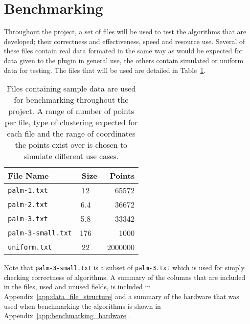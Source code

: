 
\section{Benchmarking}
\label{sec:benchmarking}

Throughout the project, a set of files will be used to test the algorithms that
are developed; their correctness and effectiveness, speed and resource use.
Several of these files contain real data formated in the same way as would be
expected for data given to the plugin in general use, the others contain
simulated or uniform data for testing. The files that will be used are detailed
in Table~\ref{tab:benchmarking-files}.

\renewcommand{\arraystretch}{1.3}
\begin{table}[htbp]
\centering
\begin{tabular} {l c r}
	\toprule
	File Name & Size & Points \\
	\midrule
	\texttt{palm-1.txt} & \SI{12}{\mebi\byte} & 65572 \\
	\texttt{palm-2.txt} & \SI{6.4}{\mebi\byte} & 36672 \\
	\texttt{palm-3.txt} & \SI{5.8}{\mebi\byte} & 33342 \\
	\texttt{palm-3-small.txt} & \SI{176}{\kibi\byte} & 1000 \\
	\texttt{uniform.txt} & \SI{22}{\mebi\byte} & 2000000 \\
	\bottomrule
\end{tabular}

\caption[Sample data files used for testing and benchmarking.]{Files containing
	sample data are used for benchmarking throughout the project. A range of
	number of points per file, type of clustering expected for each file and
	the range of coordinates the points exist over is chosen to simulate
	different use cases.}\label{tab:benchmarking-files}
\end{table}

Note that \texttt{palm-3-small.txt} is a subset of \texttt{palm-3.txt} which
is used for simply checking correctness of algorithms. A summary of the
columns that are included in the files, used and unused fields, is included in
Appendix~\ref{app:data_file_structure} and a summary of the hardware that was
used when benchmarking the algorithms is shown in
Appendix~\ref{app:benchmarking_hardware}.
